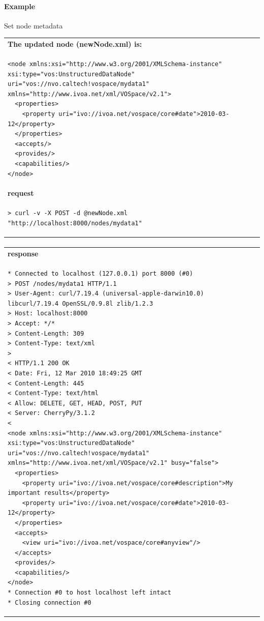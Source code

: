 \documentclass[11pt,a4paper]{ivoa}
\begin{document}
\paragraph{Example}
Set node metadata

\begin{tabular}{ p{10cm} }
\\
\textbf{The updated node (newNode.xml) is:} \\
\begin{lstlisting}
<node xmlns:xsi="http://www.w3.org/2001/XMLSchema-instance"
xsi:type="vos:UnstructuredDataNode"
uri="vos://nvo.caltech!vospace/mydata1"
xmlns="http://www.ivoa.net/xml/VOSpace/v2.1">
  <properties>
    <property uri="ivo://ivoa.net/vospace/core#date">2010-03-12</property>
  </properties>
  <accepts/>
  <provides/>
  <capabilities/>
</node>
\end{lstlisting} \\
\textbf{request} \\
\begin{lstlisting}
> curl -v -X POST -d @newNode.xml "http://localhost:8000/nodes/mydata1"
\end{lstlisting} \\
\end{tabular}
\paragraph{}
\begin{tabular}{ p{10cm} }
\textbf{response} \\
\begin{lstlisting}
* Connected to localhost (127.0.0.1) port 8000 (#0)
> POST /nodes/mydata1 HTTP/1.1
> User-Agent: curl/7.19.4 (universal-apple-darwin10.0) libcurl/7.19.4 OpenSSL/0.9.8l zlib/1.2.3
> Host: localhost:8000
> Accept: */*
> Content-Length: 309
> Content-Type: text/xml
> 
< HTTP/1.1 200 OK
< Date: Fri, 12 Mar 2010 18:49:25 GMT
< Content-Length: 445
< Content-Type: text/html
< Allow: DELETE, GET, HEAD, POST, PUT
< Server: CherryPy/3.1.2
< 
<node xmlns:xsi="http://www.w3.org/2001/XMLSchema-instance"
xsi:type="vos:UnstructuredDataNode" uri="vos://nvo.caltech!vospace/mydata1"
xmlns="http://www.ivoa.net/xml/VOSpace/v2.1" busy="false">
  <properties>
    <property uri="ivo://ivoa.net/vospace/core#description">My important results</property>
    <property uri="ivo://ivoa.net/vospace/core#date">2010-03-12</property>
  </properties>
  <accepts>
    <view uri="ivo://ivoa.net/vospace/core#anyview"/>
  </accepts>
  <provides/>
  <capabilities/>
</node>
* Connection #0 to host localhost left intact
* Closing connection #0
\end{lstlisting}
\end{tabular}
\end{document}
